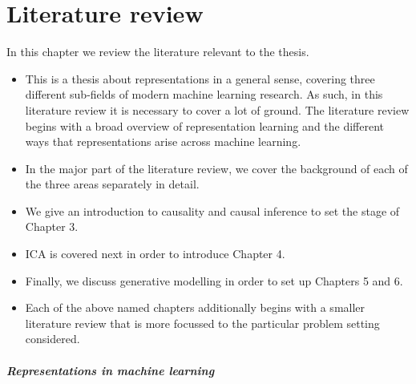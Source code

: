 
\chapter{Literature review}

\ifpdf
    \graphicspath{{Chapter2/Figs/Raster/}{Chapter2/Figs/PDF/}{Chapter2/Figs/}}
\else
    \graphicspath{{Chapter2/Figs/Vector/}{Chapter2/Figs/}}
\fi

In this chapter we review the literature relevant to the thesis.

\begin{itemize}

\item This is a thesis about representations in a general sense, covering three different sub-fields of modern machine learning research. As such, in this literature review it is necessary to cover a lot of ground. The literature review begins with a broad overview of representation learning and the different ways that representations arise across machine learning.
\item In the major part of the literature review, we cover the background of each of the three areas separately in detail.
\item We give an introduction to causality and causal inference to set the stage of Chapter 3.
\item ICA is covered next in order to introduce Chapter 4.
\item Finally, we discuss generative modelling in order to set up Chapters 5 and 6.
\item Each of the above named chapters additionally begins with a smaller literature review that is more focussed to the particular problem setting considered.
\end{itemize}

\paragraph{Representations in machine learning}

